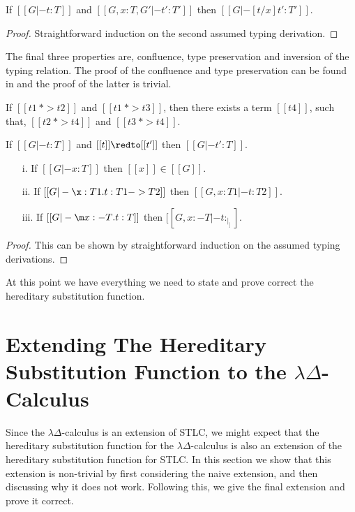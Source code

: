 \begin{lemma}
  \label{lemma:substitution_for_typing}
  If $[[G |- t : T]]$ and $[[G,x:T,G' |- t':T']]$ then $[[G |- [t/x]t':T']]$.
\end{lemma}
\begin{proof}
  Straightforward induction on the second assumed typing derivation.
\end{proof}
\noindent
The final three properties are, confluence, type preservation and inversion of the typing
relation. The proof of the confluence and type preservation can be found in \cite{Rehof:1994}
and the proof of the latter is trivial.

\begin{thm}[Confluence]
  \label{thm:confluence}
  If $[[t1 ~*> t2]]$ and $[[t1 ~*> t3]]$, then there exists a term $[[t4]]$, such that,
  $[[t2 ~*> t4]]$ and $[[t3 ~*> t4]]$.
\end{thm}

\begin{thm}[Preservation]
  \label{thm:preservation}
  If $[[G |- t : T]]$ and $[[t]] \redto [[t']]$ then $[[G |- t' : T]]$.
\end{thm}

\begin{thm}[Inversion]
  \label{theorem:inversion}
  \begin{itemize}
  \item[i.] If $[[G |- x : T]]$ then $[[x]] \in [[G]]$.
  \item[ii.] If $[[G |- \x:T1.t:T1->T2]]$ then $[[G, x:T1 |- t:T2]]$.
  \item[iii.] If $[[G |- \m x:{-T}.t:T]]$ then $[[G, x:{-T} |- t: _|_]]$.
  \end{itemize}
\end{thm}
\begin{proof}
  This can be shown by straightforward induction on the assumed typing derivations.
\end{proof}
\noindent
At this point we have everything we need to state and prove correct
the hereditary substitution function.

\section{Extending The Hereditary Substitution Function to the $\lambda\Delta$-Calculus}
\label{sec:the_hereditary_substitution_function_for_the_ld-calculus}
Since the $\lambda\Delta$-calculus is an extension of
STLC, we might expect that 
the hereditary substitution function for the $\lambda\Delta$-calculus is also an extension of the
hereditary substitution function for STLC.  In this section we show that this extension is
non-trivial by first considering the naive extension, and then discussing why it does not work.
Following this, we give the final extension and prove it correct.

